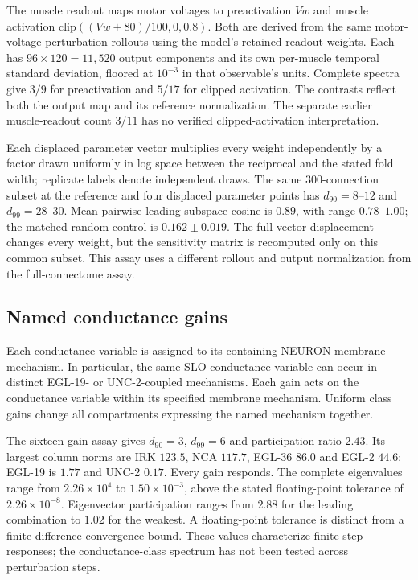 \documentclass[11pt,letterpaper]{article}
\begin{document}
The muscle readout maps motor voltages to preactivation $Vw$ and muscle activation $\mathrm{clip}((Vw+80)/100,0,0.8)$. Both are derived from the same motor-voltage perturbation rollouts using the model's retained readout weights. Each has $96\times120=11{,}520$ output components and its own per-muscle temporal standard deviation, floored at $10^{-3}$ in that observable's units. Complete spectra give $3/9$ for preactivation and $5/17$ for clipped activation. The contrasts reflect both the output map and its reference normalization. The separate earlier muscle-readout count $3/11$ has no verified clipped-activation interpretation.

Each displaced parameter vector multiplies every weight independently by a factor drawn uniformly in log space between the reciprocal and the stated fold width; replicate labels denote independent draws. The same $300$-connection subset at the reference and four displaced parameter points has $d_{90}=8$--$12$ and $d_{99}=28$--$30$. Mean pairwise leading-subspace cosine is $0.89$, with range $0.78$--$1.00$; the matched random control is $0.162\pm0.019$. The full-vector displacement changes every weight, but the sensitivity matrix is recomputed only on this common subset. This assay uses a different rollout and output normalization from the full-connectome assay.

\subsection{Named conductance gains}
Each conductance variable is assigned to its containing NEURON membrane mechanism. In particular, the same SLO conductance variable can occur in distinct EGL-19- or UNC-2-coupled mechanisms. Each gain acts on the conductance variable within its specified membrane mechanism. Uniform class gains change all compartments expressing the named mechanism together.

The sixteen-gain assay gives $d_{90}=3$, $d_{99}=6$ and participation ratio $2.43$. Its largest column norms are IRK $123.5$, NCA $117.7$, EGL-36 $86.0$ and EGL-2 $44.6$; EGL-19 is $1.77$ and UNC-2 $0.17$. Every gain responds. The complete eigenvalues range from $2.26\times10^{4}$ to $1.50\times10^{-3}$, above the stated floating-point tolerance of $2.26\times10^{-8}$. Eigenvector participation ranges from $2.88$ for the leading combination to $1.02$ for the weakest. A floating-point tolerance is distinct from a finite-difference convergence bound. These values characterize finite-step responses; the conductance-class spectrum has not been tested across perturbation steps.
\end{document}
